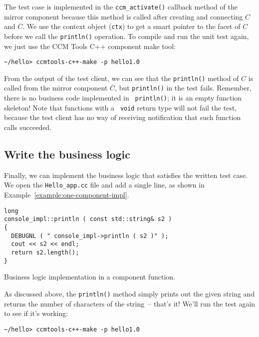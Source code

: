 The test case is implemented in the {\tt ccm\_activate()} callback method of the
mirror component because this method is called after creating and connecting $C$
and $\overline{C}$. We use the context object ({\tt ctx}) to get a smart pointer
to the facet of $C$ before we call the {\tt println()} operation. To compile and
run the unit test again, we just use the CCM Tools C++ component make tool:
\begin{small}
\begin{verbatim}
~/hello> ccmtools-c++-make -p hello1.0
\end{verbatim}
\end{small}

From the output of the test client, we can see that the {\tt println()} method
of $C$ is called from the mirror component $\overline{C}$, but {\tt println()}
in the test fails. Remember, there is no business code implemented in {\tt
println()}; it is an empty function skeleton! Note that functions with a {\tt
void} return type will not fail the test, because the test client has no way of
receiving notification that such function calls succeeded.

\subsection{Write the business logic}

Finally, we can implement the business logic that satisfies the written test
case. We open the {\tt Hello\_app.cc} file and add a single line, as shown in
Example~\ref{example:one-component-impl}.

\begin{Example}
\begin{minifbox}
\begin{small}
\begin{verbatim}
long
console_impl::println ( const std::string& s2 )
{
  DEBUGNL ( " console_impl->println ( s2 )" );
  cout << s2 << endl;
  return s2.length();
}
\end{verbatim}
\end{small}
\end{minifbox}
\caption{Business logic implementation in a component function.}
\label{example:one-component-impl}
\end{Example}

As discussed above, the {\tt println()} method simply prints out the given
string and returns the number of characters of the string~-- that's it! We'll
run the test again to see if it's working:
\begin{small}
\begin{verbatim}
~/hello> ccmtools-c++-make -p hello1.0
\end{verbatim}
\end{small}

